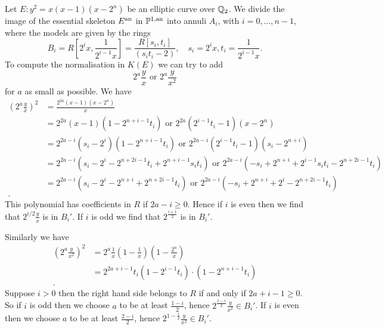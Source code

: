 Let $E: y^2 = x(x-1)(x-2^{n})$ be an elliptic curve over $\mathbb{Q}_2$. 
We divide the image of the essential skeleton $E{}^{\text{an}}$ in $\mathbb{P}^{1, \text{an}}$ into annuli $A_i$, with $i = 0, \ldots, n - 1$, where the models are given by the rings \[
	B_i = R\left[2^{i}x,\frac{1}{2^{i-1} x}\right] = \frac{R[s_i, t_i]}{(s_i t_i -2)}, \quad s_i = 2^{i} x, t_i = \frac{1}{2^{i-1} x}
.\] 
To compute the normalisation in $K(E)$ we can try to add \begin{equation}\label{eq:a}
	2^{a}\frac{y}{x} \text{ or }2^{a} \frac{y}{x^2}
\end{equation}
for $a$ as small as possible. 
We have
\begin{align*}
	\left(2^{a}\frac{y}{x}\right)^2 &= \frac{2^{2a}(x-1)(x-2^{n})}{x} \\
					&=  2^{2a}(x-1)(1 - 2^{n + i -1} t_i) \text{ or } 2^{2a}(2^{i-1}t_i - 1)(x - 2^{n})\\
					&= 2^{2a - i}(s_i-2^{i})(1 - 2^{n + i - 1}t_i) \text{ or } 2^{2a - i}(2^{i-1} t_i - 1)(s_i - 2^{n + i}) \\
					&= 2^{2a -i}(s_i - 2^{i} - 2^{n + 2i -1} t_i + 2^{n + i -1}s_i t_i) \text{ or } 2^{2a - i}(-s_i + 2^{n + i} + 2^{i -1}s_i t_i - 2^{n + 2i -1}t_i)\\
					&= 2^{2a - i}(s_i - 2^{i} - 2^{n + i} + 2^{n + 2i -1}t_i) \text{ or } 2^{2a - i}(-s_i + 2^{n + i} + 2^{i} - 2^{n + 2i -1}t_i) \\
.\end{align*}
This polynomial has coefficients in $R$ if $2a-i  \ge 0$. 
Hence if $i $ is even then we find that $2^{i / 2}\frac{y}{x}$ is in $B_i'$. 
If $i$ is odd we find that $2^{\frac{i + 1}{2}}$ is in $B_i'$. 

Similarly we have 
\begin{align*}
	\left(2^{a} \frac{y}{x^2} \right) ^2 &= 2^{a}\frac{1}{x}\left(1 - \frac{1}{x}\right)\left(1 - \frac{2^{n}}{x}\right) \\
					     &=  2^{2a + i - 1} t_i(1 - 2^{i-1}t_i)\cdot (1 - 2^{n + i-1} t_i) \\
.\end{align*}
Suppose $i > 0$ then the right hand side belongs to $R$ if and only if  $2a + i - 1 \ge 0$. 
So if  $i$ is odd then we choose $a$ to be at least $\frac{1-i}{2}$, hence $2^{\frac{1-i}{2}} \frac{y}{x^2} \in B_i '$. 
If $i$ is even then we choose $a$ to be at least $\frac{2-i}{2}$, hence $2^{1-\frac{i}{2}}\frac{y}{x^2} \in B_i'$.




